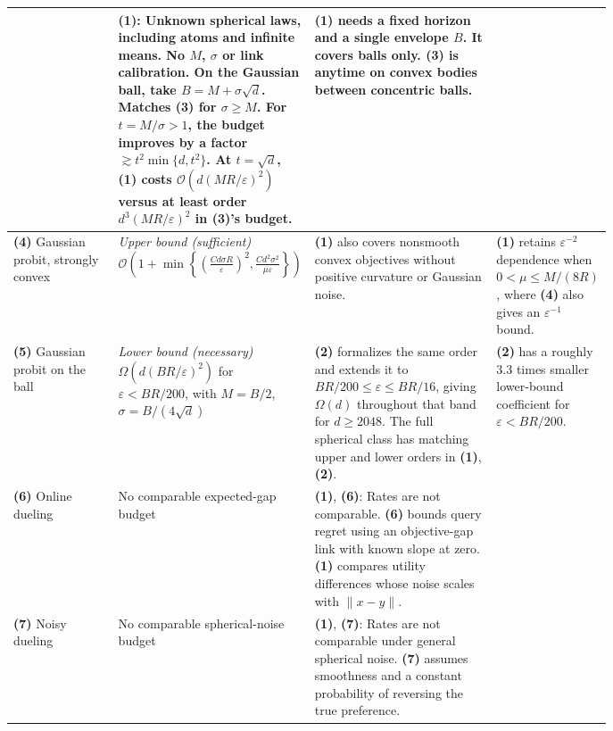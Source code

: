 \begin{table}[tp]
\begin{threeparttable}
\begin{tabularx}{\linewidth}{@{}>{\raggedright\arraybackslash}p{0.19\linewidth}>{\raggedright\arraybackslash}p{0.27\linewidth}>{\raggedright\arraybackslash}p{0.32\linewidth}>{\raggedright\arraybackslash}X@{}}
& \textbf{(1)}: Unknown spherical laws, including atoms and infinite means. No $M$, $\sigma$ or link calibration. On the Gaussian ball, take $B=M+\sigma\sqrt d$. Matches \textbf{(3)} for $\sigma\ge M$. For $t=M/\sigma>1$, the budget improves by a factor $\gtrsim t^2\min\{d,t^2\}$. At $t=\sqrt d$, \textbf{(1)} costs $\mathcal{O}(d(MR/\varepsilon)^2)$ versus at least order $d^3(MR/\varepsilon)^2$ in \textbf{(3)}'s budget.
& \textbf{(1)} needs a fixed horizon and a single envelope $B$. It covers balls only. \textbf{(3)} is anytime on convex bodies between concentric balls. \\
\midrule
\textbf{(4)} \citep[Thm.~2(a)]{sruKovalev2026v1} Gaussian probit, strongly convex
& \textit{Upper bound (sufficient)}\newline $\mathcal{O}\!\left(1+\min\!\left\{\left(\frac{Cd\sigma R}{\varepsilon}\right)^2,\frac{Cd^2\sigma^2}{\mu\varepsilon}\right\}\right)$
& \textbf{(1)} also covers nonsmooth convex objectives without positive curvature or Gaussian noise.
& \textbf{(1)} retains $\varepsilon^{-2}$ dependence when $0<\mu\le M/(8R)$, where \textbf{(4)} also gives an $\varepsilon^{-1}$ bound. \\
\midrule
\textbf{(5)} \citep[Thm.~2(b)]{sruKovalev2026v1} Gaussian probit on the ball
& \textit{Lower bound (necessary)}\newline $\Omega(d(BR/\varepsilon)^2)$ for $\varepsilon<BR/200$, with $M=B/2$, $\sigma=B/(4\sqrt d)$
& \textbf{(2)} formalizes the same order and extends it to $BR/200\le\varepsilon\le BR/16$, giving $\Omega(d)$ throughout that band for $d\ge2048$. The full spherical class has matching upper and lower orders in \textbf{(1)}, \textbf{(2)}.
& \textbf{(2)} has a roughly $3.3$ times smaller lower-bound coefficient for $\varepsilon<BR/200$. \\
\midrule
\textbf{(6)} \citep[Thm.~2]{sruLu2026v3} Online dueling
& No comparable expected-gap budget
& \textbf{(1)}, \textbf{(6)}: Rates are not comparable. \textbf{(6)} bounds query regret using an objective-gap link with known slope at zero. \textbf{(1)} compares utility differences whose noise scales with $\|x-y\|$.
& \\
\midrule
\textbf{(7)} \citep{sruSaha2021} Noisy dueling
& No comparable spherical-noise budget
& \textbf{(1)}, \textbf{(7)}: Rates are not comparable under general spherical noise. \textbf{(7)} assumes smoothness and a constant probability of reversing the true preference.
& \\
\bottomrule
\end{tabularx}

\end{threeparttable}
\end{table}
